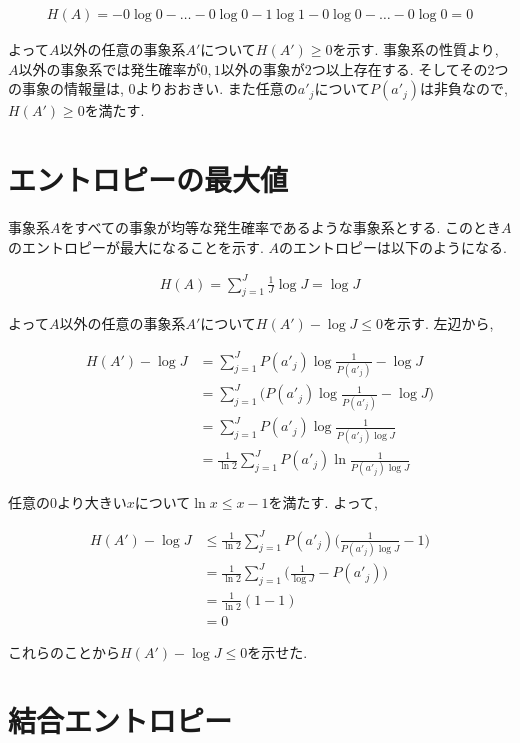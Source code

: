 \documentclass[dvipdfmx, 10pt]{jsarticle}
\begin{document}
\begin{align*}
    H(A) = -0 \log 0 - \dots -0 \log 0 - 1 \log 1 -0 \log 0 - \dots -0 \log 0 = 0
\end{align*}

よって\(A\)以外の任意の事象系\(A'\)について\(H(A') \geq 0\)を示す. 
事象系の性質より, \(A\)以外の事象系では発生確率が\(0, 1\)以外の事象が\(2\)つ以上存在する. 
そしてその2つの事象の情報量は, \(0\)よりおおきい. また任意の\(a'_j\)について\(P(a'_j)\)は非負なので, \(H(A') \geq 0\)を満たす. 

\section*{エントロピーの最大値}
事象系\(A\)をすべての事象が均等な発生確率であるような事象系とする. 
このとき\(A\)のエントロピーが最大になることを示す. \(A\)のエントロピーは以下のようになる. 

\begin{align*}
    H(A) = \sum_{j=1}^{J} \frac{1}{J} \log J = \log J
\end{align*}

よって\(A\)以外の任意の事象系\(A'\)について\(H(A') - \log J \leq 0 \)を示す. 左辺から, 

\begin{align*}
    H(A') - \log J 
    &= \sum_{j=1}^{J} P(a'_j) \log \frac{1}{P(a'_j)} - \log J \\
    &= \sum_{j=1}^{J}\Big ( P(a'_j) \log \frac{1}{P(a'_j)} - \log J \Big) \\
    &= \sum_{j=1}^{J} P(a'_j) \log \frac{1}{P(a'_j) \log J } \\
    &= \frac{1}{\ln2} \sum_{j=1}^{J} P(a'_j) \ln \frac{1}{P(a'_j) \log J }
\end{align*}

任意の\(0\)より大きい\(x\)について\(\ln x \leq x -1\)を満たす. よって, 

\begin{align*}
    H(A') - \log J 
    &\leq \frac{1}{\ln2} \sum_{j=1}^{J} P(a'_j) \Big( \frac{1}{P(a'_j) \log J } - 1 \Big) \\
    &= \frac{1}{\ln2} \sum_{j=1}^{J} \Big( \frac{1}{\log J} - P(a'_j) \Big) \\
    &= \frac{1}{\ln2} (1 - 1) \\
    &= 0
\end{align*}

これらのことから\(H(A') - \log J \leq 0 \)を示せた. 

\section*{結合エントロピー}
\end{document}
